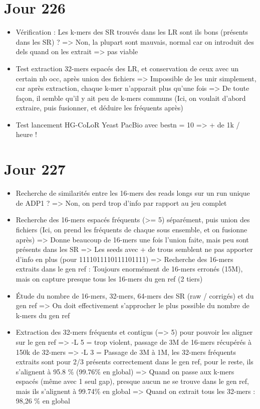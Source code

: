 \documentclass[12pt]{report}
\begin{document}
\section{Jour 226}

\begin{itemize}
	\item Vérification : Les k-mers des SR trouvés dans les LR sont ils bons (présents dans les SR) ? => Non, la plupart
		  sont mauvais, normal car on introduit des dels quand on les extrait
		  => pas viable
		  
	\item Test extraction 32-mers espacés des LR, et conservation de ceux avec un certain nb occ, après union des fichiers
		  => Impossible de les unir simplement, car après extraction, chaque k-mer n'apparait plus qu'une fois
		  => De toute façon, il semble qu'il y ait peu de k-mers communs
		  (Ici, on voulait d'abord extraire, puis fusionner, et déduire les fréquents après)
		  
	\item Test lancement HG-CoLoR Yeast PacBio avec bestn = 10 => + de 1k / heure !
\end{itemize}

\section{Jour 227}

\begin{itemize}
	\item Recherche de similarités entre les 16-mers des reads longs sur un run unique de ADP1 ?
		  => Non, on perd trop d'info par rapport au jeu complet
		  
	\item Recherche des 16-mers espacés fréquents (>= 5) séparément, puis union des fichiers
		  (Ici, on prend les fréquents de chaque sous ensemble, et on fusionne après)
		  => Donne beaucoup de 16-mers une fois l'union faite, mais peu sont présents dans les SR
		  => Les seeds avec + de trous semblent ne pas apporter d'info en plus (pour 1111011110111101111)
		  => Recherche des 16-mers extraits dans le gen ref : Toujours enormément de 16-mers erronés (15M),
		  mais on capture presque tous les 16-mers du gen ref (2 tiers)
		  
	\item Étude du nombre de 16-mers, 32-mers, 64-mers des SR (raw / corrigés) et du gen ref 
		  => On doit effectivement s'approcher le plus possible du nombre de k-mers du gen ref
			
	\item Extraction des 32-mers fréquents et contigus (=> 5) pour pouvoir les aligner sur le gen ref
		  => -L 5 = trop violent, passage de 3M de 16-mers récupérés à 150k de 32-mers
		  => -L 3 = Passage de 3M à 1M, les 32-mers fréquents extraits sont pour 2/3 présents correctement dans le gen ref,
		  	  pour le reste, ils s'alignent à 95.8 \% (99.76\% en global)
		  => Quand on passe aux k-mers espacés (même avec 1 seul gap), presque aucun ne se trouve dans le gen ref,
		  	 mais ils s'alignent à 99.74\% en global
		  => Quand on extrait tous les 32-mers : 98,26 \% en global
\end{itemize}
\end{document}
